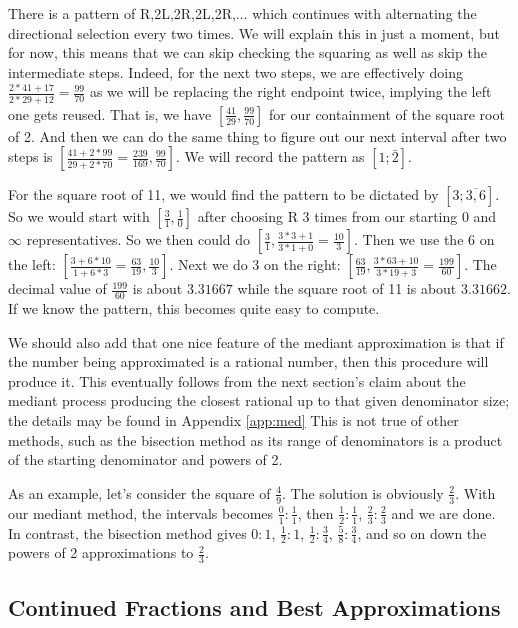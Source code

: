 \documentclass[12pt]{article}
\theoremstyle{remark}
\begin{document}
There is a pattern of R,2L,2R,2L,2R,$\ldots$ which continues with alternating the directional selection every two times. We will explain this in just a moment, but for now, this means that we can skip checking the squaring as well as skip the intermediate steps. Indeed, for the next two steps, we are effectively doing $\tfrac{2*41 + 17}{2*29 + 12} = \tfrac{99}{70}$ as we will be replacing the right endpoint twice, implying the left one gets reused. That is, we have $[\tfrac{41}{29}, \tfrac{99}{70}]$ for our containment of the square root of 2. And then we can do the same thing to figure out our next interval after two steps is $[\tfrac{41+2*99}{29+2*70}=\tfrac{239}{169}, \tfrac{99}{70}]$. We will record the pattern as $[1; \bar{2}]$.

For the square root of 11, we would find the pattern to be dictated by $[3;\overline{3,6}]$. So we would start with $[\tfrac{3}{1}, \tfrac{1}{0}]$ after choosing R 3 times from our starting 0 and $\infty$ representatives. So we then could do $[\tfrac{3}{1}, \tfrac{3*3 + 1}{3*1 + 0} = \tfrac{10}{3}]$. Then we use the 6 on the left:  $[\tfrac{3+6*10}{1+6*3} = \tfrac{63}{19}, \tfrac{10}{3}]$. Next we do 3 on the right:  $[\tfrac{63}{19}, \tfrac{3*63+10}{3*19+3} = \tfrac{199}{60}]$. The decimal value of $\tfrac{199}{60}$ is about $3.31667$ while the square root of 11 is about $3.31662$. If we know the pattern, this becomes quite easy to compute. 

We should also add that one nice feature of the mediant approximation is that if the number being approximated is a rational number, then this procedure will produce it. This eventually follows from the next section's claim about the mediant process producing the closest rational up to that given denominator size; the details may be found in Appendix \ref{app:med} This is not true of other methods, such as the bisection method as its range of denominators is a product of the starting denominator and powers of 2. 

As an example, let's consider the square of $\frac{4}{9}$. The solution is obviously $\frac{2}{3}$. With our mediant method, the intervals becomes $\frac{0}{1}:\frac{1}{1}$, then $\frac{1}{2}:\frac{1}{1}$, $\frac{2}{3}:\frac{2}{3}$ and we are done. In contrast, the bisection method gives $0:1$, $\frac{1}{2}:1$, $\frac{1}{2}:\frac{3}{4}$, $\frac{5}{8}:\frac{3}{4}$, and so on down the powers of 2 approximations to $\frac{2}{3}$. 

\subsection{Continued Fractions and Best Approximations}
\end{document}
